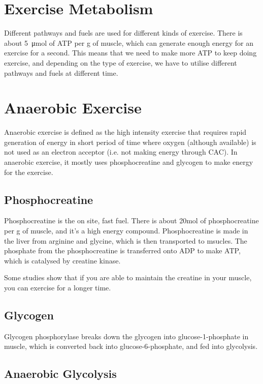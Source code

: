 \section{Exercise Metabolism}

Different pathways and fuels are used for different kinds of exercise.
There is about \SI{5}{\micro\mol} of ATP per g of muscle, which can generate enough energy for an exercise for a second.
This means that we need to make more ATP to keep doing exercise, and depending on the type of exercise, we have to utilise different pathways and fuels at different time.

\section{Anaerobic Exercise}

Anaerobic exercise is defined as the high intensity exercise that requires rapid generation of energy in short period of time where oxygen (although available) is not used as an electron acceptor (i.e. not making energy through CAC).
In anaerobic exercise, it mostly uses phosphocreatine and glycogen to make energy for the exercise.

\subsection{Phosphocreatine}

Phosphocreatine is the on site, fast fuel.
There is about 20mol of phosphocreatine per g of muscle, and it's a high energy compound.
Phosphocreatine is made in the liver from arginine and glycine, which is then transported to msucles.
The phosphate from the phosphocreatine is transferred onto ADP to make ATP, which is catalysed by creatine kinase.

Some studies show that if you are able to maintain the creatine in your muscle, you can exercise for a longer time.

\subsection{Glycogen}

Glycogen phosphorylase breaks down the glycogen into glucose-1-phosphate in muscle, which is converted back into glucose-6-phosphate, and fed into glycolysis.

\subsection{Anaerobic Glycolysis}

